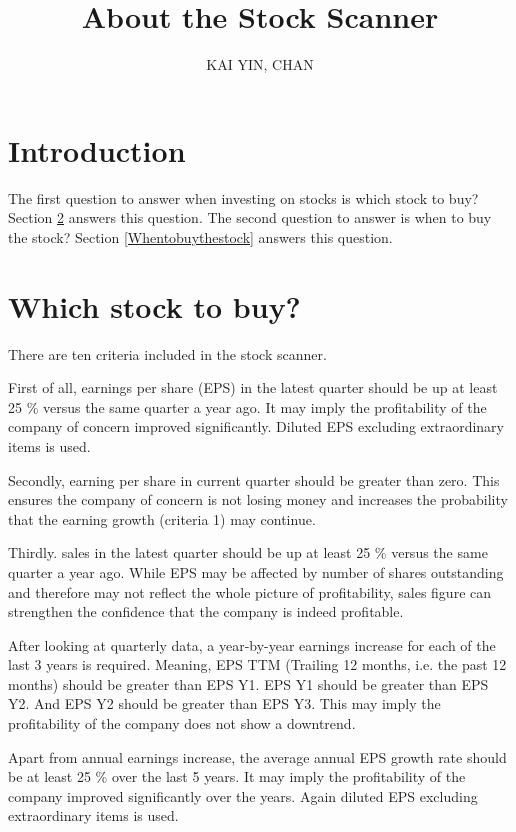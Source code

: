 \documentclass{article}
\begin{document}
\title{About the Stock Scanner}
\author{KAI YIN, CHAN}
\maketitle
\section{Introduction}
The first question to answer when investing on stocks is which stock to buy? Section \ref{Whichstocktobuy} answers this question. The second question to answer is when to buy the stock? Section \ref{Whentobuythestock} answers this question.

\section{Which stock to buy?}
\label{Whichstocktobuy}
There are ten criteria included in the stock scanner.

First of all, earnings per share (EPS) in the latest quarter should be up at least 25 \% versus the same quarter a year ago. It may imply the profitability of the company of concern improved significantly. Diluted EPS excluding extraordinary items is used.

Secondly, earning per share in current quarter should be greater than zero. This ensures the company of concern is not losing money and increases the probability that the earning growth (criteria 1) may continue.

Thirdly. sales in the latest quarter should be up at least 25 \% versus the same quarter a year ago. While EPS may be affected by number of shares outstanding and therefore may not reflect the whole picture of profitability, sales figure can strengthen the confidence that the company is indeed profitable.

After looking at quarterly data, a year-by-year earnings increase for each of the last 3 years is required. Meaning, EPS TTM (Trailing 12 months, i.e. the past 12 months) should be greater than EPS Y1. EPS Y1 should be greater than EPS Y2. And EPS Y2 should be greater than EPS Y3. This may imply the profitability of the company does not show a downtrend.

Apart from annual earnings increase, the average annual EPS growth rate should be at least 25 \% over the last 5 years. It may imply the profitability of the company improved significantly over the years. Again diluted EPS excluding extraordinary items is used.
\end{document}
